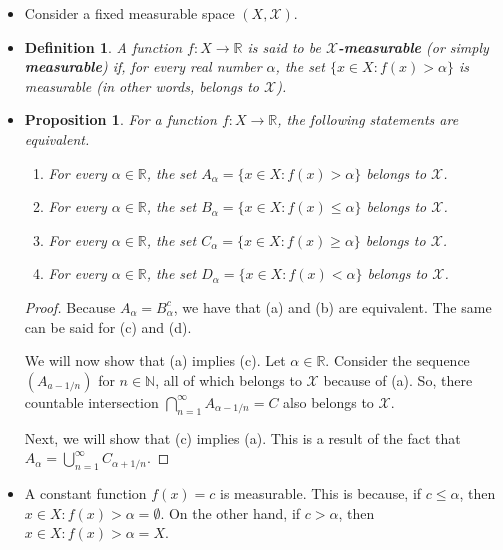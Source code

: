 \documentclass[10pt]{article}
\newtheorem{definition}[lemma]{Definition}
\newtheorem{proposition}[lemma]{Proposition}
\newcommand{\mcal}[1]{\mathcal{#1}}
\newcommand{\Real}{\mathbb{R}}
\begin{document}
\begin{itemize}
  \item Consider a fixed measurable space $(X,\mcal{X})$.
    
  \item \begin{definition}
    A function $f: X \rightarrow \Real$ is said to be {\bf $\mcal{X}$-measurable} (or simply {\bf measurable}) if, for every real number $\alpha$, the set $\{ x \in X : f(x) > \alpha \}$ is measurable (in other words, belongs to $\mcal{X}$).
  \end{definition}

  \item \begin{proposition}
  For a function $f: X \rightarrow \Real$, the following statements are equivalent.
  \begin{enumerate}
    \item[(a)] For every $\alpha \in \Real$, the set $A_\alpha = \{ x \in X : f(x) > \alpha \}$ belongs to $\mcal{X}$.
    \item[(b)] For every $\alpha \in \Real$, the set $B_\alpha = \{ x \in X : f(x) \leq \alpha \}$ belongs to $\mcal{X}$.
    \item[(c)] For every $\alpha \in \Real$, the set $C_\alpha = \{ x \in X : f(x) \geq \alpha \}$ belongs to $\mcal{X}$.
    \item[(d)] For every $\alpha \in \Real$, the set $D_\alpha = \{ x \in X : f(x) < \alpha \}$ belongs to $\mcal{X}$. 
  \end{enumerate}
  \end{proposition}

  \begin{proof}
    Because $A_\alpha = B^c_\alpha$, we have that (a) and (b) are equivalent. The same can be said for (c) and (d).

    We will now show that (a) implies (c). Let $\alpha \in \Real$. Consider the sequence $(A_{a-1/n})$ for $n \in \mathbb{N}$, all of which belongs to $\mcal{X}$ because of (a). So, there countable intersection $\bigcap_{n=1}^\infty A_{\alpha-1/n} = C$ also belongs to $\mcal{X}$.

    Next, we will show that (c) implies (a). This is a result of the fact that $A_\alpha = \bigcup_{n=1}^\infty C_{\alpha + 1/n}$.
  \end{proof}

  \item A constant function $f(x) = c$ is measurable. This is because, if $c \leq \alpha$, then ${x \in X: f(x) > \alpha} = \emptyset$. On the other hand, if $c > \alpha$, then ${x \in X: f(x) > \alpha} = X$.
  

\end{itemize}
\end{document}
